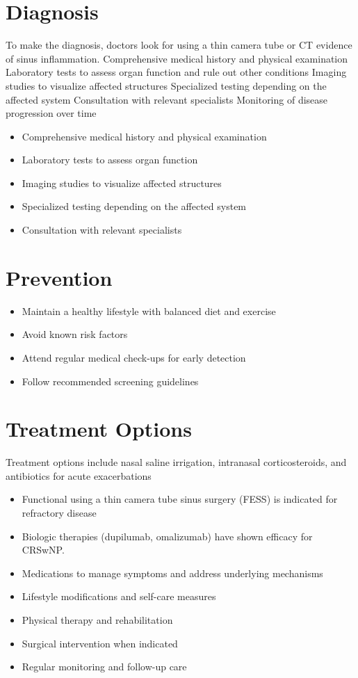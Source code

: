\section{Diagnosis}
To make the diagnosis, doctors look for using a thin camera tube or CT evidence of sinus inflammation. Comprehensive medical history and physical examination Laboratory tests to assess organ function and rule out other conditions Imaging studies to visualize affected structures Specialized testing depending on the affected system Consultation with relevant specialists Monitoring of disease progression over time

\begin{itemize}[noitemsep]
  \item Comprehensive medical history and physical examination
  \item Laboratory tests to assess organ function
  \item Imaging studies to visualize affected structures
  \item Specialized testing depending on the affected system
  \item Consultation with relevant specialists
\end{itemize}
\section{Prevention}
\begin{itemize}[noitemsep]
  \item Maintain a healthy lifestyle with balanced diet and exercise
  \item Avoid known risk factors
  \item Attend regular medical check-ups for early detection
  \item Follow recommended screening guidelines
\end{itemize}
\section{Treatment Options}
Treatment options include nasal saline irrigation, intranasal corticosteroids, and antibiotics for acute exacerbations

\begin{itemize}[noitemsep]
  \item Functional using a thin camera tube sinus surgery (FESS) is indicated for refractory disease
  \item Biologic therapies (dupilumab, omalizumab) have shown efficacy for CRSwNP.
  \item Medications to manage symptoms and address underlying mechanisms
  \item Lifestyle modifications and self-care measures
  \item Physical therapy and rehabilitation
  \item Surgical intervention when indicated
  \item Regular monitoring and follow-up care
\end{itemize}
